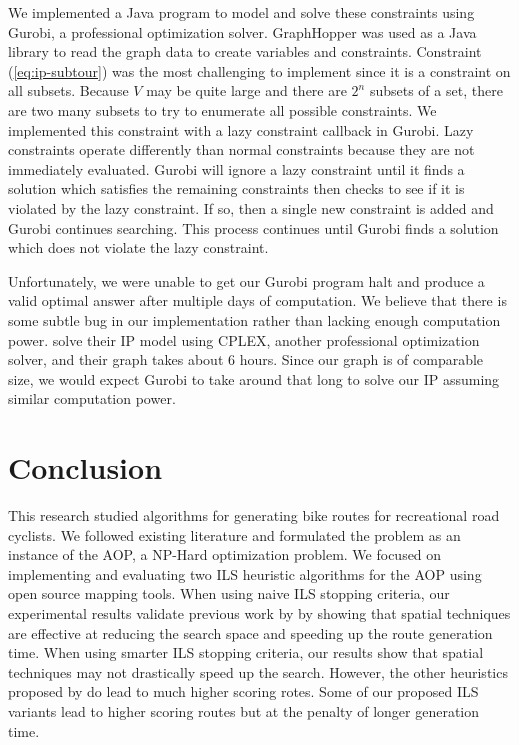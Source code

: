 \documentclass[honors]{union-cs-thesis}
\begin{document}
We implemented a Java program to model and solve these constraints using Gurobi, a professional optimization solver. GraphHopper was used as a Java library to read the graph data to create variables and constraints. Constraint (\ref{eq:ip-subtour}) was the most challenging to implement since it is a constraint on all subsets. Because $V$ may be quite large and there are $2^n$ subsets of a set, there are two many subsets to try to enumerate all possible constraints. We implemented this constraint with a lazy constraint callback in Gurobi. Lazy constraints operate differently than normal constraints because they are not immediately evaluated. Gurobi will ignore a lazy constraint until it finds a solution which satisfies the remaining constraints then checks to see if it is violated by the lazy constraint. If so, then a single new constraint is added and Gurobi continues searching. This process continues until Gurobi finds a solution which does not violate the lazy constraint.

Unfortunately, we were unable to get our Gurobi program halt and produce a valid optimal answer after multiple days of computation. We believe that there is some subtle bug in our implementation rather than lacking enough computation power. \citeauthor{verbeeck2014extension} solve their IP model using CPLEX, another professional optimization solver, and their graph takes about 6 hours. Since our graph is of comparable size, we would expect Gurobi to take around that long to solve our IP assuming similar computation power.

\section{Conclusion}
This research studied algorithms for generating bike routes for recreational road cyclists. We followed existing literature and formulated the problem as an instance of the AOP, a NP-Hard optimization problem. We focused on implementing and evaluating two ILS heuristic algorithms \cite{verbeeck2014extension} \cite{lu2015arc} for the AOP using open source mapping tools. When using naive ILS stopping criteria, our experimental results validate previous work by \cite{lu2015arc} by showing that spatial techniques are effective at reducing the search space and speeding up the route generation time. When using smarter ILS stopping criteria, our results show that spatial techniques may not drastically speed up the search. However, the other heuristics proposed by \cite{lu2015arc} do lead to much higher scoring rotes. Some of our proposed ILS variants lead to higher scoring routes but at the penalty of longer generation time.
\end{document}
